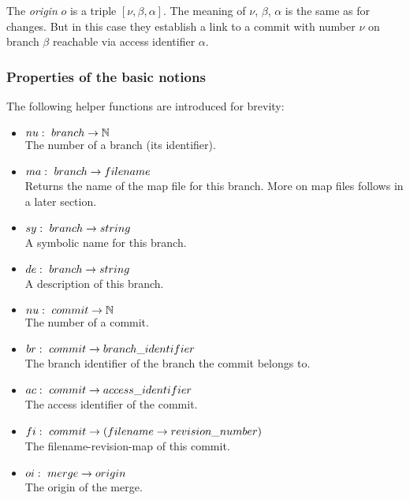 \documentclass[fleqn, 10pt, a4paper]{article}
\begin{document}
The \emph{origin} $o$ is a triple $[\nu, \beta, \alpha]$. The meaning
of $\nu$, $\beta$, $\alpha$ is the same as for changes. But
in this case they establish a link to a commit with number $\nu$
on branch $\beta$ reachable via access identifier $\alpha$.

\subsubsection{Properties of the basic notions}

The following helper functions are introduced for brevity:

\begin{itemize}
\item $\mathnormal{nu}:\ \mathnormal{branch} \rightarrow \mathbb{N}$ \\
The number of a branch (its identifier).
\item $\mathnormal{ma}:\ \mathnormal{branch} \rightarrow \mathnormal{filename}$ \\
Returns the name of the map file for this branch. More on map files follows in
a later section.
\item $\mathnormal{sy}:\ \mathnormal{branch} \rightarrow \mathnormal{string}$ \\
A symbolic name for this branch.
\item $\mathnormal{de}:\ \mathnormal{branch} \rightarrow \mathnormal{string}$ \\
A description of this branch.
\item $\mathnormal{nu}:\ \mathnormal{commit} \rightarrow \mathbb{N}$ \\
The number of a commit.
\item $\mathnormal{br}:\ \mathnormal{commit} \rightarrow \mathnormal{branch\_identifier}$ \\
The branch identifier of the branch the commit belongs to.
\item $\mathnormal{ac}:\ \mathnormal{commit} \rightarrow \mathnormal{access\_identifier}$ \\
The access identifier of the commit.
\item $\mathnormal{fi}:\ \mathnormal{commit} \rightarrow (\mathnormal{filename}
\rightarrow \mathnormal{revision\_number})$ \\
The filename-revision-map of this commit.
\item $\mathnormal{oi}:\ \mathnormal{merge} \rightarrow \mathnormal{origin}$ \\
The origin of the merge.
\end{itemize}
\end{document}
